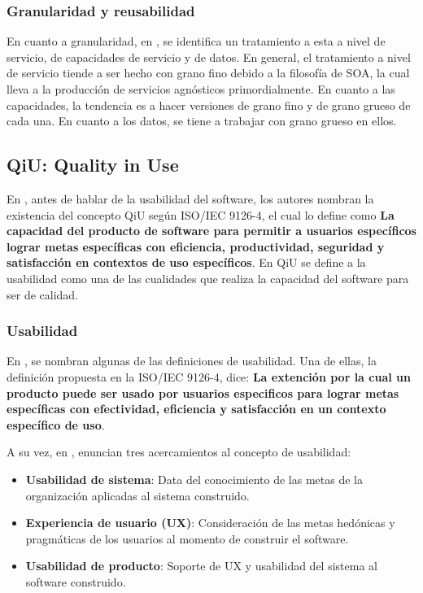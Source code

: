 \subsubsection{Granularidad y reusabilidad}

En cuanto a granularidad, en \cite{soa_principles}, se identifica un tratamiento a esta a nivel de servicio, de capacidades de servicio y de datos. En general, el tratamiento a nivel de servicio tiende a ser hecho con grano fino debido a la filosofía de SOA, la cual lleva a la producción de servicios agnósticos primordialmente. En cuanto a las capacidades, la tendencia es a hacer versiones de grano fino y de grano grueso de cada una. En cuanto a los datos, se tiene a trabajar con grano grueso en ellos.

\subsection{QiU: Quality in Use}

En \cite{quality_in_use}, antes de hablar de la usabilidad del software, los autores nombran la existencia del concepto QiU según ISO/IEC 9126-4, el cual lo define como \textbf{La capacidad del producto de software para permitir a usuarios específicos lograr metas específicas con eficiencia, productividad, seguridad y satisfacción en contextos de uso específicos}. En QiU se define a la usabilidad como una de las cualidades que realiza la capacidad del software para ser de calidad.

\subsubsection{Usabilidad}

En \cite{quality_in_use}, se nombran algunas de las definiciones de usabilidad. Una de ellas, la definición propuesta en la ISO/IEC 9126-4, dice: \textbf{La extención por la cual un producto puede ser usado por usuarios especificos para lograr metas específicas con efectividad, eficiencia y satisfacción en un contexto específico de uso}.

A su vez, en \cite{quality_in_use}, enuncian tres acercamientos al concepto de usabilidad:

\begin{itemize}
 \item \textbf{Usabilidad de sistema}: Data del conocimiento de las metas de la organización aplicadas al sistema construido.
\item \textbf{Experiencia de usuario (UX)}: Consideración de las metas hedónicas y pragmáticas de los usuarios al momento de construir el software.
\item \textbf{Usabilidad de producto}: Soporte de UX y usabilidad del sistema al software construido.
\end{itemize}


